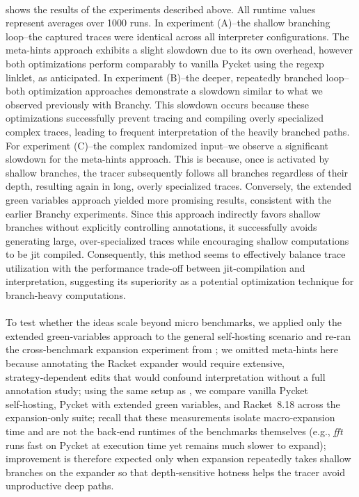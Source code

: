     \paragraph{}%
       shows the results of the experiments described above. All runtime values represent averages over 1000 runs. In experiment (A)--the shallow branching loop--the captured traces were identical across all interpreter configurations. The meta-hints approach exhibits a slight slowdown due to its own overhead, however both optimizations perform comparably to vanilla Pycket using the regexp linklet, as anticipated. In experiment (B)--the deeper, repeatedly branched loop--both optimization approaches demonstrate a slowdown similar to what we observed previously with Branchy. This slowdown occurs because these optimizations successfully prevent tracing and compiling overly specialized complex traces, leading to frequent interpretation of the heavily branched paths. For experiment (C)--the complex randomized input--we observe a significant slowdown for the meta-hints approach. This is because, once  is activated by shallow branches, the tracer subsequently follows all branches regardless of their depth, resulting again in long, overly specialized traces. Conversely, the extended green variables approach yielded more promising results, consistent with the earlier Branchy experiments. Since this approach indirectly favors shallow branches without explicitly controlling  annotations, it successfully avoids generating large, over-specialized traces while encouraging shallow computations to be \gls{jit} compiled. Consequently, this method seems to effectively balance trace utilization with the performance trade-off between \gls{jit}-compilation and interpretation, suggesting its superiority as a potential optimization technique for branch-heavy computations.

    \paragraph{}%
      To test whether the ideas scale beyond micro benchmarks, we applied only the extended green‑variables approach to the general self‑hosting scenario and re‑ran the cross‑benchmark expansion experiment from ; we omitted meta‑hints here because annotating the Racket expander would require extensive, strategy‑dependent edits that would confound interpretation without a full annotation study; using the same setup as , we compare vanilla Pycket self‑hosting, Pycket with extended green variables, and Racket 8.18 across the expansion‑only suite; recall that these measurements isolate macro‑expansion time and are not the back‑end runtimes of the benchmarks themselves (e.g., \emph{fft} runs fast on Pycket at execution time yet remains much slower to expand); improvement is therefore expected only when expansion repeatedly takes shallow branches on the expander so that depth‑sensitive hotness helps the tracer avoid unproductive deep paths.


